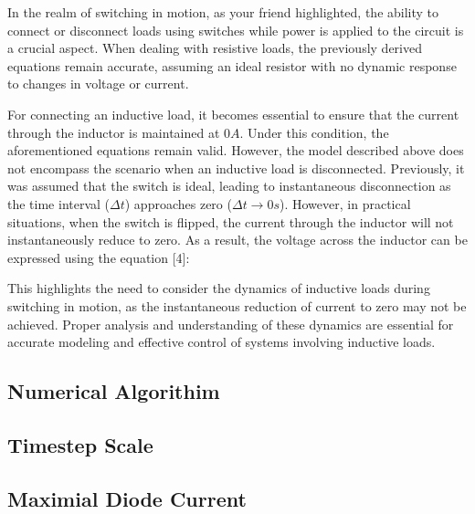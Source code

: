 In the realm of switching in motion, as your friend highlighted, the ability to connect or disconnect loads using switches while power is applied to the circuit is a crucial aspect. When dealing with resistive loads, the previously derived equations remain accurate, assuming an ideal resistor with no dynamic response to changes in voltage or current.

For connecting an inductive load, it becomes essential to ensure that the current through the inductor is maintained at $0A$. Under this condition, the aforementioned equations remain valid. However, the model described above does not encompass the scenario when an inductive load is disconnected. Previously, it was assumed that the switch is ideal, leading to instantaneous disconnection as the time interval ($\Delta t$) approaches zero ($\Delta t \to 0s$). However, in practical situations, when the switch is flipped, the current through the inductor will not instantaneously reduce to zero. As a result, the voltage across the inductor can be expressed using the equation [4]:

This highlights the need to consider the dynamics of inductive loads during switching in motion, as the instantaneous reduction of current to zero may not be achieved. Proper analysis and understanding of these dynamics are essential for accurate modeling and effective control of systems involving inductive loads.

    















\subsection{Numerical Algorithim}
\subsection{Timestep Scale}
\subsection{Maximial Diode Current}